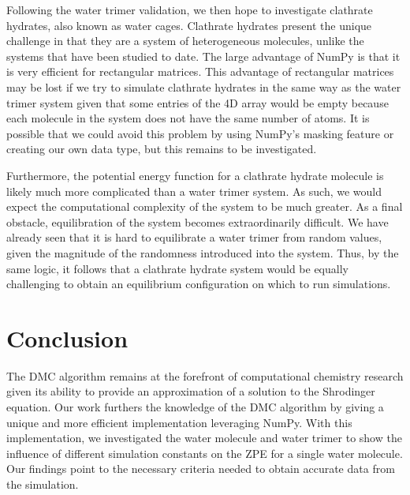 \documentclass[journal=jacsat,manuscript=article]{achemso}
\begin{document}
Following the water trimer validation, we then hope to investigate clathrate hydrates\cite{Englezos1993}, also known as water cages. Clathrate hydrates present the unique challenge in that they are a system of heterogeneous molecules, unlike the systems that have been studied to date. The large advantage of NumPy is that it is very efficient for rectangular matrices. This advantage of rectangular matrices may be lost if we try to simulate clathrate hydrates in the same way as the water trimer system given that some entries of the 4D array would be empty because each molecule in the system does not have the same number of atoms. It is possible that we could avoid this problem by using NumPy’s masking feature or creating our own data type, but this remains to be investigated. 

Furthermore, the potential energy function for a clathrate hydrate molecule is likely much more complicated than a water trimer system. As such, we would expect the computational complexity of the system to be much greater. As a final obstacle, equilibration of the system becomes extraordinarily difficult. We have already seen that it is hard to equilibrate a water trimer from random values, given the magnitude of the randomness introduced into the system. Thus, by the same logic, it follows that a clathrate hydrate system would be equally challenging to obtain an equilibrium configuration on which to run simulations.

\section{Conclusion}

The DMC algorithm remains at the forefront of computational chemistry research given its ability to provide an approximation of a solution to the Shrodinger equation. Our work furthers the knowledge of the DMC algorithm by giving a unique and more efficient implementation leveraging NumPy. With this implementation, we investigated the water molecule and water trimer to show the influence of different simulation constants on the ZPE for a single water molecule. Our findings point to the necessary criteria needed to obtain accurate data from the simulation. 



\end{document}
